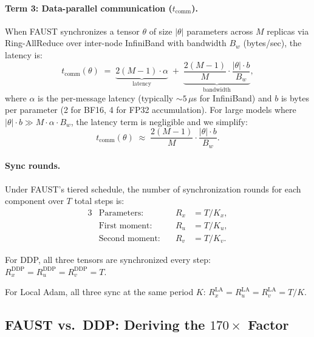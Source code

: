 \documentclass{article}
\begin{document}
\paragraph{Term 3: Data-parallel communication ($t_{\text{comm}}$).}

When FAUST synchronizes a tensor $\theta$ of size $|\theta|$
parameters across $M$ replicas via Ring-AllReduce over inter-node
InfiniBand with bandwidth $B_w$ (bytes/sec), the latency is:
\begin{equation}
t_{\text{comm}}(\theta) \;=\;
\underbrace{2(M-1) \cdot \alpha}_{\text{latency}}
\;+\; \underbrace{\frac{2(M-1)}{M} \cdot
\frac{|\theta| \cdot b}{B_w}}_{\text{bandwidth}},
\label{eq:t_comm}
\end{equation}
where $\alpha$ is the per-message latency (typically $\sim 5\,\mu$s for
InfiniBand) and $b$ is bytes per parameter (2 for BF16, 4 for FP32
accumulation). For large models where
$|\theta| \cdot b \gg M \cdot \alpha \cdot B_w$, the latency term is
negligible and we simplify:
\begin{equation}
t_{\text{comm}}(\theta)
\;\approx\; \frac{2(M-1)}{M} \cdot \frac{|\theta| \cdot b}{B_w}.
\label{eq:t_comm_approx}
\end{equation}

\paragraph{Sync rounds.}
Under FAUST's tiered schedule, the number of synchronization rounds
for each component over $T$ total steps is:
\begin{alignat}{3}
&\text{Parameters:}\quad& R_x &= T / K_x, \label{eq:Rx} \\
&\text{First moment:}\quad& R_u &= T / K_u, \label{eq:Ru} \\
&\text{Second moment:}\quad& R_v &= T / K_v. \label{eq:Rv}
\end{alignat}

For DDP, all three tensors are synchronized every step:
$R_x^{\text{DDP}} = R_u^{\text{DDP}} = R_v^{\text{DDP}} = T$.

For Local Adam, all three sync at the same period $K$:
$R_x^{\text{LA}} = R_u^{\text{LA}} = R_v^{\text{LA}} = T/K$.

\subsection{FAUST vs.\ DDP: Deriving the \texorpdfstring{$170\times$}{170x} Factor}
\end{document}
